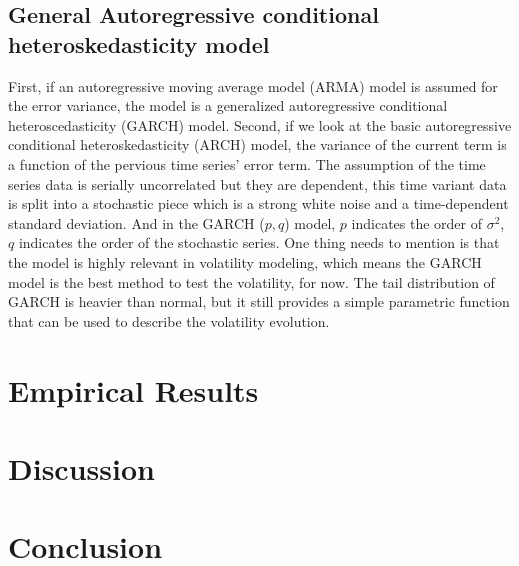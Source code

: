 \documentclass[12pt,letterpaper]{article}
\begin{document}
\subsection{General Autoregressive conditional heteroskedasticity model}
First, if an autoregressive moving average model (ARMA) model is assumed for the error variance, the model is a generalized autoregressive conditional heteroscedasticity (GARCH) model.
Second, if we look at the basic autoregressive conditional heteroskedasticity (ARCH) model, the variance of the current term is a function of the pervious time series' error term. 
The assumption of the time series data is serially uncorrelated but they are dependent, this time variant data is split into a stochastic piece which is a strong white noise and a time-dependent standard deviation.
And in the GARCH ($p,q$) model, $p$ indicates the order of $\sigma^2$, $q$ indicates the order of the stochastic series.
One thing needs to mention is that the model is highly relevant in volatility modeling, which means the GARCH model is the best method to test the volatility, for now.
The tail distribution of GARCH is heavier than normal, but it still provides a simple parametric function that can be used to describe the volatility evolution. 


\section{Empirical Results}

\section{Discussion}

\section{Conclusion}
\end{document}
